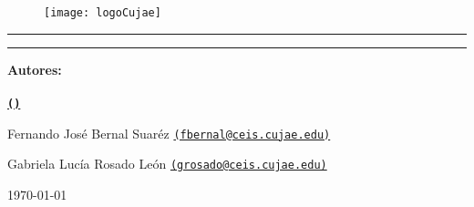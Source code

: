 \begin{titlepage}
	\centering %
	
	\begin{figure}[h]
		\centering
		\texttt{[image: logoCujae]} %
	\end{figure}
	
	{\LARGE \textbf{\university}\par}
	
	\vspace{0.4cm} %
	
	{\Large \faculty \par}
	\vspace{1cm} %
	
	\rule{\textwidth}{1pt} %
	
	\vspace{0.2cm} %
	
	{\Huge\bfseries \getTitle\par}
	
	\vspace{0.2cm} %
	
	\rule{\textwidth}{1pt} %
	
	{\Large \documentName \par}
	\vspace{1.0cm} %
	
	{\Large\bfseries Autores: \\[0.3cm]
		\getAuthor \\[0.2cm]
		\href{mailto:\authorEmail}{\texttt{(\authorEmail)}}\par
		
		Fernando José Bernal Suaréz
		\href{mailto:fbernal@ceis.cujae.edu}{\texttt{(fbernal@ceis.cujae.edu)}}\par
		
		Gabriela Lucía Rosado León
		\href{mailto:grosado@ceis.cujae.edu}{\texttt{(grosado@ceis.cujae.edu)}}\par
	
	}
	
	\vspace{0.5cm} %
	\vspace{0.5cm} %
	
	{\large \today\par} %
	
	\vfill %
	
	\enlargethispage{0.5cm} %
\end{titlepage}